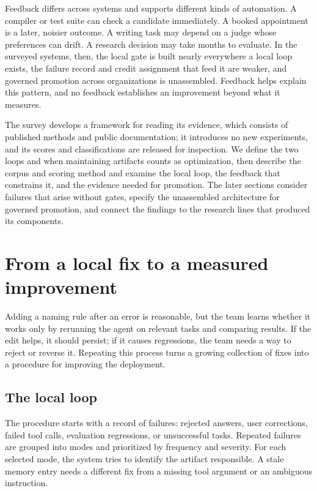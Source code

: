 \documentclass[
  11pt,
]{article}
\begin{document}
Feedback differs across systems and supports different kinds of automation. A compiler or test suite can check a candidate immediately. A booked appointment is a later, noisier outcome. A writing task may depend on a judge whose preferences can drift. A research decision may take months to evaluate. In the surveyed systems, then, the local gate is built nearly everywhere a local loop exists, the failure record and credit assignment that feed it are weaker, and governed promotion across organizations is unassembled. Feedback helps explain this pattern, and no feedback establishes an improvement beyond what it measures.

The survey develops a framework for reading its evidence, which consists of published methods and public documentation; it introduces no new experiments, and its scores and classifications are released for inspection. We define the two loops and when maintaining artifacts counts as optimization, then describe the corpus and scoring method and examine the local loop, the feedback that constrains it, and the evidence needed for promotion. The later sections consider failures that arise without gates, specify the unassembled architecture for governed promotion, and connect the findings to the research lines that produced its components.

\section{From a local fix to a measured improvement}\label{sec:loop}

Adding a naming rule after an error is reasonable, but the team learns whether it works only by rerunning the agent on relevant tasks and comparing results. If the edit helps, it should persist; if it causes regressions, the team needs a way to reject or reverse it. Repeating this process turns a growing collection of fixes into a procedure for improving the deployment.

\subsection{The local loop}\label{the-local-loop}

The procedure starts with a record of failures: rejected answers, user corrections, failed tool calls, evaluation regressions, or unsuccessful tasks. Repeated failures are grouped into modes and prioritized by frequency and severity. For each selected mode, the system tries to identify the artifact responsible. A stale memory entry needs a different fix from a missing tool argument or an ambiguous instruction.
\end{document}
